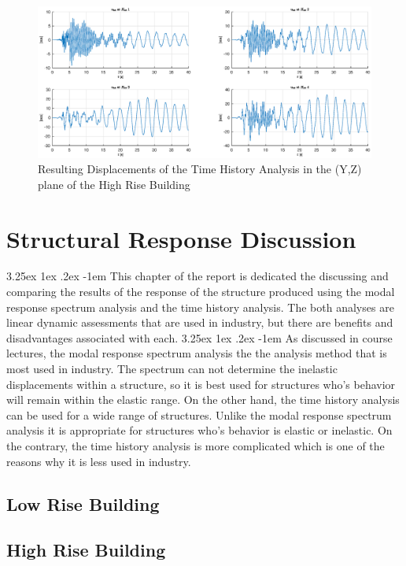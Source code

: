 \documentclass[11pt,a4paper,titlepage]{report}
\makeatletter
\renewcommand\paragraph{\@startsection{paragraph}{5}{\z@}%
  {3.25ex \@plus1ex \@minus.2ex}%
  {-1em}%
  {\normalfont\normalsize\bfseries}}
\makeatother
\begin{document}
\begin{figure} [h]
    \centering
    \includegraphics[width=16cm]{HR_TH_Y.eps}
    \caption{Resulting Displacements of the Time History Analysis in the (Y,Z) plane of the High Rise Building}
    \label{fig:HR_TH_Y}
\end{figure}
\chapter{Structural Response Discussion}
\paragraph{}This chapter of the report is dedicated the discussing and comparing the results of the response of the structure produced using the modal response spectrum analysis and the time history analysis. The both analyses are linear dynamic assessments that are used in industry, but there are benefits and disadvantages associated with each. 
\paragraph{}As discussed in course lectures, the modal response spectrum analysis the the analysis method that is most used in industry. The spectrum can not determine the inelastic displacements within a structure, so it is best used for structures who's behavior will remain within the elastic range. On the other hand, the time history analysis can be used for a wide range of structures. Unlike the modal response spectrum analysis it is appropriate for structures who's behavior is elastic or inelastic. On the contrary, the time history analysis is more complicated which is one of the reasons why it is less used in industry.
\section{Low Rise Building}
\section{High Rise Building}
\end{document}
